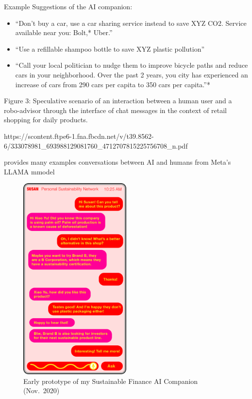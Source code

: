 \documentclass[
  letterpaper,
  DIV=11,
  numbers=noendperiod]{scrartcl}
\begin{document}
Example Suggestions of the AI companion:

\begin{itemize}
\item
  ``Don't buy a car, use a car sharing service instead to save XYZ CO2.
  Service available near you: Bolt,* Uber.''
\item
  ``Use a refillable shampoo bottle to save XYZ plastic pollution''
\item
  ``Call your local politician to nudge them to improve bicycle paths
  and reduce cars in your neighborhood. Over the past 2 years, you city
  has experienced an increase of cars from 290 cars per capita to 350
  cars per capita.''*
\end{itemize}

Figure 3: Speculative scenario of an interaction between a human user
and a robo-advisor through the interface of chat messages in the context
of retail shopping for daily products.

https://scontent.ftpe6-1.fna.fbcdn.net/v/t39.8562-6/333078981\_693988129081760\_4712707815225756708\_n.pdf

provides many examples conversations between AI and humans from Meta's
LLAMA mmodel

\begin{figure}[H]

{\centering \includegraphics[width=0.5\textwidth,height=\textheight]{./images/prototypes/susan-pink-app.png}

}

\caption{Early prototype of my Sustainable Finance AI Companion
(Nov.~2020)}

\end{figure}%
\end{document}
